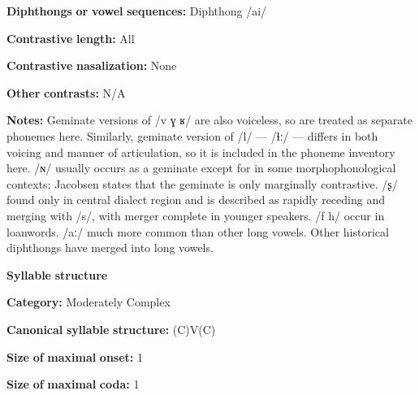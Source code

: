 \begin{styleBody}
\textbf{Diphthongs} \textbf{or} \textbf{vowel} \textbf{sequences:} Diphthong /ai/
\end{styleBody}

\begin{styleBody}
\textbf{Contrastive} \textbf{length:} All
\end{styleBody}

\begin{styleBody}
\textbf{Contrastive} \textbf{nasalization:} None
\end{styleBody}

\begin{styleBody}
\textbf{Other} \textbf{contrasts:} N/A
\end{styleBody}

\begin{styleBody}
\textbf{Notes:} Geminate versions of /v ɣ ʁ/ are also voiceless, so are treated as separate phonemes here. Similarly, geminate version of /l/ — /ɬː/ — differs in both voicing and manner of articulation, so it is included in the phoneme inventory here. /ɴ/ usually occurs as a geminate except for in some morphophonological contexts; Jacobsen states that the geminate is only marginally contrastive. /ʂ/ found only in central dialect region and is described as rapidly receding and merging with /s/, with merger complete in younger speakers. /f h/ occur in loanwords. /aː/ much more common than other long vowels. Other historical diphthongs have merged into long vowels.
\end{styleBody}

\begin{styleBody}
\textbf{Syllable} \textbf{structure}
\end{styleBody}

\begin{styleBody}
\textbf{Category:} Moderately Complex
\end{styleBody}

\begin{styleBody}
\textbf{Canonical} \textbf{syllable} \textbf{structure:} (C)V(C) \citep[338-9]{Fortescue1984}
\end{styleBody}

\begin{styleBody}
\textbf{Size} \textbf{of} \textbf{maximal} \textbf{onset:} 1
\end{styleBody}

\begin{styleBody}
\textbf{Size} \textbf{of} \textbf{maximal} \textbf{coda:} 1
\end{styleBody}


